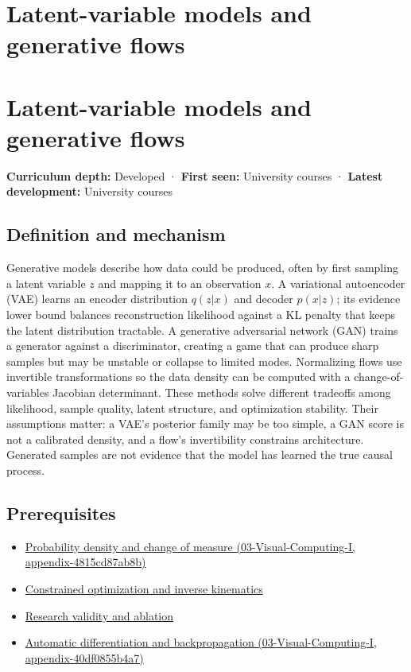 \hypertarget{appendix-2c568f05ee34}{}
\section*{Latent-variable models and generative flows}
\section{Latent-variable models and generative flows}\label{latent-variable-models-and-generative-flows}

\textbf{Curriculum depth:} Developed · \textbf{First seen:} University courses · \textbf{Latest development:} University courses

\subsection{Definition and mechanism}\label{definition-and-mechanism}

Generative models describe how data could be produced, often by first sampling a latent variable \(z\) and mapping it to an observation \(x\). A variational autoencoder (VAE) learns an encoder distribution \(q(z|x)\) and decoder \(p(x|z)\); its evidence lower bound balances reconstruction likelihood against a KL penalty that keeps the latent distribution tractable. A generative adversarial network (GAN) trains a generator against a discriminator, creating a game that can produce sharp samples but may be unstable or collapse to limited modes. Normalizing flows use invertible transformations so the data density can be computed with a change-of-variables Jacobian determinant. These methods solve different tradeoffs among likelihood, sample quality, latent structure, and optimization stability. Their assumptions matter: a VAE's posterior family may be too simple, a GAN score is not a calibrated density, and a flow's invertibility constrains architecture. Generated samples are not evidence that the model has learned the true causal process.

\subsection{Prerequisites}\label{prerequisites}

\begin{itemize}
\tightlist
\item
  \href{}{Probability density and change of measure (03-Visual-Computing-I, appendix-4815cd87ab8b)}
\item
  \hyperref[appendix-29f4bea4c2bb]{Constrained optimization and inverse kinematics}
\item
  \hyperref[appendix-65788587ef78]{Research validity and ablation}
\item
  \href{}{Automatic differentiation and backpropagation (03-Visual-Computing-I, appendix-40df0855b4a7)}
\end{itemize}

